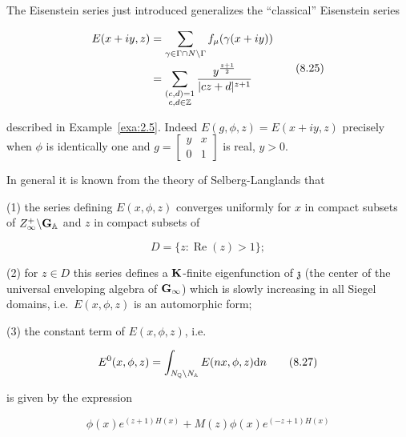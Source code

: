 \begin{remark}\label{rem:8.5}

The Eisenstein series just introduced generalizes the ``classical'' Eisenstein series

\begin{equation}\label{eq:8.25}
\begin{aligned}
E(x + iy, z) &= \sum_{\gamma \in \Gamma \cap N \backslash \Gamma} f_{\mu}(\gamma(x + iy))\\
&= \sum_{\substack{(c,d) = 1 \\ c,d \in \mathbb{Z}}} \frac{y^{\frac{z+1}{2}}}{|cz + d|^{z+1}}
\end{aligned}\tag{8.25}
\end{equation}

described in Example~\ref{exa:2.5}. Indeed $E(g,\phi,z) = E(x + iy,z)$ precisely when $\phi$ is identically one and $g = \begin{bmatrix} y & x \\ 0 & 1 \end{bmatrix}$ is real, $y > 0$.

\end{remark}

In general it is known from the theory of Selberg-Langlands that

(1) the series defining $E(x,\phi,z)$ converges uniformly for $x$ in compact subsets of $Z_{\infty}^{+}\backslash\mathbf{G}_{\mathbb{A}}$ and $z$ in compact subsets of

\begin{equation}\label{eq:8.26}
D = \{z: \operatorname{Re}(z) > 1\};\tag{8.26}
\end{equation}

(2) for $z \in D$ this series defines a $\mathbf{K}$-finite eigenfunction of $\mathfrak{z}$ (the center of the universal enveloping algebra of $\mathbf{G}_{\infty}$) which is slowly increasing in all Siegel domains, i.e.\ $E(x,\phi,z)$ is an automorphic form;

(3) the constant term of $E(x,\phi,z)$, i.e.

\begin{equation}\label{eq:8.27}
E^{0}(x,\phi,z) = \int_{N_{\mathbb{Q}}\backslash N_{\mathbb{A}}} E(nx,\phi,z) \mathrm{d} n\tag{8.27}
\end{equation}

is given by the expression

\begin{equation}\label{eq:8.28}
\phi(x)e^{(z+1)H(x)} + M(z)\phi(x)e^{(-z+1)H(x)}\tag{8.28}
\end{equation}

